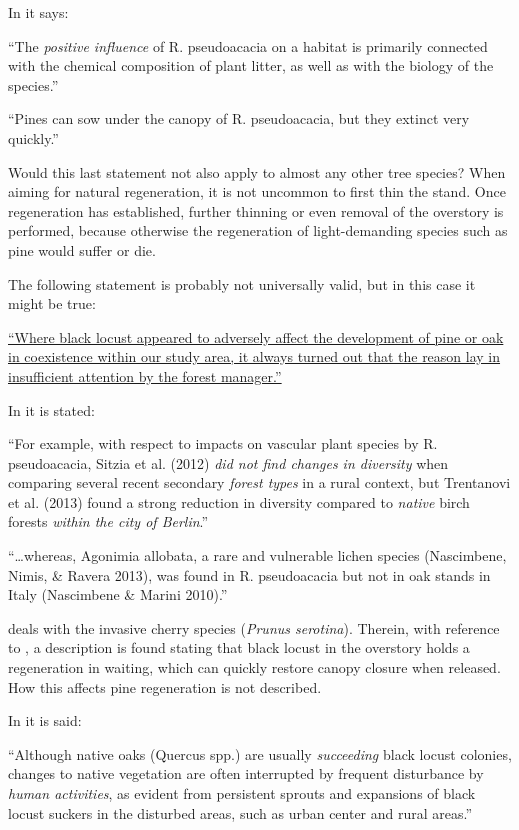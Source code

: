 In \citet{rahmonov2009robinieLitter} it says:

\enquote{The \emph{positive influence} of R. pseudoacacia on a habitat
  is primarily connected with the chemical composition of plant
  litter, as well as with the biology of the species.}

\enquote{Pines can sow under the canopy of R. pseudoacacia, but they
  extinct very quickly.}

Would this last statement not also apply to almost any other tree species?
When aiming for natural regeneration, it is not uncommon to first thin the stand.
Once regeneration has established, further thinning or even removal of the
overstory is performed, because otherwise the regeneration of light-demanding
species such as pine would suffer or die.

The following statement is probably not universally valid, but in this case
it might be true:

\hyperlink{german:erteld1952robinieErtrag}{\enquote{Where black locust appeared to adversely affect the development of pine or oak in coexistence within our study area, it always turned out that the reason lay in insufficient attention by the forest manager.}} \citep[own translation, p.~90]{erteld1952robinieErtrag}

In \cite{campagnaro2018alien} it is stated:

\enquote{For example, with respect to impacts on vascular plant
  species by R.  pseudoacacia, Sitzia et al. (2012) \emph{did not find
  changes in diversity} when comparing several recent secondary
  \emph{forest types} in a rural context, but Trentanovi et al. (2013)
  found a strong reduction in diversity compared to \emph{native}
  birch forests \emph{within the city of Berlin}.}

\enquote{\dots whereas, Agonimia allobata, a rare and vulnerable
  lichen species (Nascimbene, Nimis, \& Ravera 2013), was found in
  R. pseudoacacia but not in oak stands in Italy (Nascimbene \& Marini
  2010).}

\citet{sebert2007invasive} deals with the invasive cherry species
(\emph{Prunus serotina}). Therein, with reference to \citet{lee2004robinie},
a description is found stating that black locust in the overstory holds a
regeneration in waiting, which can quickly restore canopy closure when
released. How this affects pine regeneration is not described.

In \citet{lee2004robinie} it is said:

\enquote{Although native oaks (Quercus spp.) are usually
  \emph{succeeding} black locust colonies, changes to native
  vegetation are often interrupted by frequent disturbance by
  \emph{human activities}, as evident from persistent sprouts and
  expansions of black locust suckers in the disturbed areas, such as
  urban center and rural areas.}

